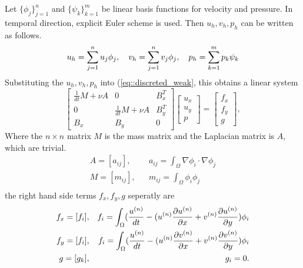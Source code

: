 \documentclass[a4paper, 11pt]{article}
\begin{document}
   Let $\{\phi_j \}_{j = 1}^n$ and $\{\psi_k\}_{k = 1}^m$ be linear basis
   functions for velocity and pressure. In temporal direction, explicit
   Euler scheme is used. Then $u_h, v_h, p_h$ can be written as follows.
   \begin{equation}
     u_h = \sum_{j = 1}^n u_j \phi_j, \quad v_h = \sum_{j = 1}^n v_j
     \phi_j, \quad p_h = \sum_{k = 1}^m p_k \psi_k 
     \notag
   \end{equation}
   Substituting the $u_h, v_h, p_h$ into (\ref{eq::discreted_weak}, 
   this obtains a linear system
   \begin{equation}
     \left[
       \begin{array}{lll}
         \frac{1}{dt} M + \nu A & 0 & B_x^T \\
         0 & \frac{1}{dt} M +\nu A  & B_y^T \\
         B_x & B_y & 0
       \end{array}
     \right]
     \left[
       \begin{array}{c}
          u_x \\
          u_y \\
          p
       \end{array}
     \right] = 
     \left[
       \begin{array}{c}
         f_x \\
         f_y \\
         g
       \end{array}
     \right],
     \label{eq::linear_system}
   \end{equation}
   Where the $n \times n$ matrix $M$ is the mass matrix and the Laplacian
   matrix is $A$, which are trivial.
   \begin{eqnarray}
     A = [a_{ij}], && a_{ij} = \int_\Omega \nabla \phi_i \cdot \nabla
     \phi_j \\
     M = [m_{ij}], && m_{ij} = \int_{\Omega}\phi_i \phi_j \\
   \end{eqnarray}
   the right hand side terms $f_x, f_y, g$ seperatly are
   \begin{eqnarray}
     f_x = [f_i], && f_i = \int_\Omega (\frac{u^{(n)}}{dt} - (u^{(n)}
       \frac{\partial u^{(n)}}{\partial x} + v^{(n)} \frac{\partial
       u^{(n)}}{\partial y}) \phi_i \notag \\
     f_y = [f_i], && f_i = \int_\Omega (\frac{u^{(n)}}{dt} - (u^{(n)}
       \frac{\partial v^{(n)}}{\partial x} + v^{(n)} \frac{\partial
         v^{(n)}}{\partial y}) \phi_i \notag \\
     g = [g_k], && g_i = 0. \notag
   \end{eqnarray}
\end{document}
